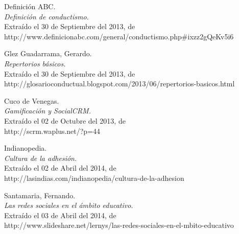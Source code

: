 \begin{thebibliography}{99}
 Definición ABC.\\
\emph{Definición de conductismo.}\\
Extraído el 30 de Septiembre del 2013, de\\
http://www.definicionabc.com/general/conductismo.php\#ixzz2gQeKv5i6

 Glez Guadarrama, Gerardo.\\
\emph{Repertorios básicos.}\\
Extraído el 30 de Septiembre del 2013, de\\
http://glosarioconductual.blogspot.com/2013/06/repertorios-basicos.html

 Cuco de Venegas.\\
\emph{Gamificación y SocialCRM.}\\
Extraído el 02 de Octubre del 2013, de\\
http://scrm.waplus.net/?p=44

 Indianopedia.\\
\emph{Cultura de la adhesión.}\\
Extraído el 02 de Abril del 2014, de\\
http://lasindias.com/indianopedia/cultura-de-la-adhesion

 Santamaria, Fernando.\\
\emph{Las redes sociales en el ámbito educativo.}\\
Extraído el 03 de Abril del 2014, de\\
http://www.slideshare.net/lernys/las-redes-sociales-en-el-mbito-educativo

\end{thebibliography}
